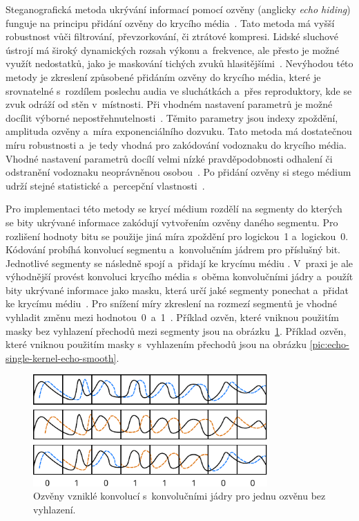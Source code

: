 Steganografická metoda ukrývání informací pomocí ozvěny (anglicky \textit{echo
hiding}) funguje na principu přidání ozvěny do krycího
média~\cite{Djebbar2012}. Tato metoda má vyšší robustnost vůči filtrování,
převzorkování, či ztrátové kompresi. Lidské sluchové ústrojí má široký
dynamických rozsah výkonu a~frekvence, ale přesto je možné využít nedostatků,
jako je maskování tichých zvuků hlasitějšími~\cite{Gruhl1996}. Nevýhodou této
metody je zkreslení způsobené přidáním ozvěny do krycího média, které je
srovnatelné s~rozdílem poslechu audia ve sluchátkách a~přes reproduktory, kde
se zvuk odráží od stěn v~místnosti. Při vhodném nastavení parametrů je možné
docílit výborné nepostřehnutelnosti~\cite{Gruhl1996}. Těmito parametry jsou
indexy zpoždění, amplituda ozvěny a~míra exponenciálního dozvuku. Tato metoda
má dostatečnou míru robustnosti a~je tedy vhodná pro zakódování vodoznaku do
krycího média. Vhodné nastavení parametrů docílí velmi nízké pravděpodobnosti
odhalení či odstranění vodoznaku neoprávněnou osobou~\cite{Gruhl1996}. Po
přidání ozvěny si stego médium udrží stejné statistické a~percepční
vlastnosti~\cite{Djebbar2012}.

Pro implementaci této metody se krycí médium rozdělí na segmenty do kterých se
bity ukrývané informace zakódují vytvořením ozvěny daného segmentu. Pro
rozlišení hodnoty bitu se použije jiná míra zpoždění pro logickou~1
a~logickou~0. Kódování probíhá konvolucí segmentu a~konvolučním jádrem pro
příslušný bit. Jednotlivé segmenty se následně spojí a~přidají ke krycímu médiu
\cite{Gruhl1996}. V~praxi je ale výhodnější provést konvoluci krycího média
s~oběma konvolučními jádry a~použít bity ukrývané informace jako masku, která
určí jaké segmenty ponechat a~přidat ke krycímu médiu~\cite{Gruhl1996}. Pro
snížení míry zkreslení na rozmezí segmentů je vhodné vyhladit změnu mezi
hodnotou~0~a~1~\cite{Tekeli2017}. Příklad ozvěn, které vniknou použitím masky
bez vyhlazení přechodů mezi segmenty jsou na
obrázku~\ref{pic:echo-single-kernel-echo}. Příklad ozvěn, které vniknou
použitím masky s~vyhlazením přechodů jsou na obrázku
\ref{pic:echo-single-kernel-echo-smooth}.

\begin{figure}[hbt]
    \centering
    \includegraphics[width=0.8\textwidth]{obrazky/echo-diagram.pdf}
    \caption{Ozvěny vzniklé konvolucí s~konvolučními jádry pro jednu ozvěnu bez
    vyhlazení.}
    \label{pic:echo-single-kernel-echo}
\end{figure}

